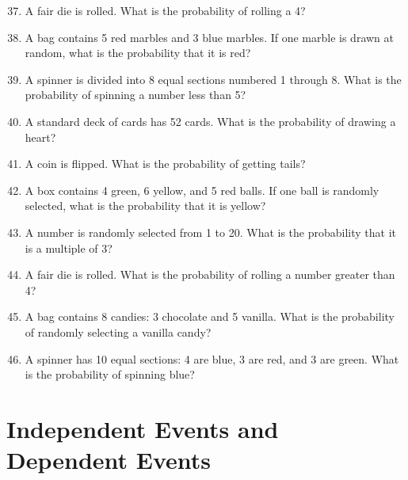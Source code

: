 \documentclass[12pt]{article}
\begin{document}
\begin{enumerate}
\setcounter{enumi}{36}

\item A fair die is rolled. What is the probability of rolling a 4?

\item A bag contains 5 red marbles and 3 blue marbles. If one marble is drawn at random, what is the probability that it is red?

\item A spinner is divided into 8 equal sections numbered 1 through 8. What is the probability of spinning a number less than 5?

\item A standard deck of cards has 52 cards. What is the probability of drawing a heart?

\item A coin is flipped. What is the probability of getting tails?

\item A box contains 4 green, 6 yellow, and 5 red balls. If one ball is randomly selected, what is the probability that it is yellow?

\item A number is randomly selected from 1 to 20. What is the probability that it is a multiple of 3?

\item A fair die is rolled. What is the probability of rolling a number greater than 4?

\item A bag contains 8 candies: 3 chocolate and 5 vanilla. What is the probability of randomly selecting a vanilla candy?

\item A spinner has 10 equal sections: 4 are blue, 3 are red, and 3 are green. What is the probability of spinning blue?

\end{enumerate}

\section{Independent Events and Dependent Events}
\end{document}
